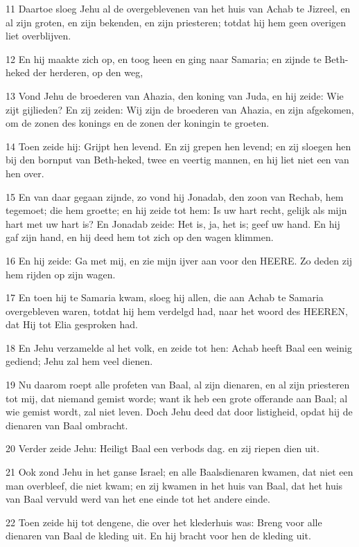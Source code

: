 \par 11 Daartoe sloeg Jehu al de overgeblevenen van het huis van Achab te Jizreel, en al zijn groten, en zijn bekenden, en zijn priesteren; totdat hij hem geen overigen liet overblijven.
\par 12 En hij maakte zich op, en toog heen en ging naar Samaria; en zijnde te Beth-heked der herderen, op den weg,
\par 13 Vond Jehu de broederen van Ahazia, den koning van Juda, en hij zeide: Wie zijt gijlieden? En zij zeiden: Wij zijn de broederen van Ahazia, en zijn afgekomen, om de zonen des konings en de zonen der koningin te groeten.
\par 14 Toen zeide hij: Grijpt hen levend. En zij grepen hen levend; en zij sloegen hen bij den bornput van Beth-heked, twee en veertig mannen, en hij liet niet een van hen over.
\par 15 En van daar gegaan zijnde, zo vond hij Jonadab, den zoon van Rechab, hem tegemoet; die hem groette; en hij zeide tot hem: Is uw hart recht, gelijk als mijn hart met uw hart is? En Jonadab zeide: Het is, ja, het is; geef uw hand. En hij gaf zijn hand, en hij deed hem tot zich op den wagen klimmen.
\par 16 En hij zeide: Ga met mij, en zie mijn ijver aan voor den HEERE. Zo deden zij hem rijden op zijn wagen.
\par 17 En toen hij te Samaria kwam, sloeg hij allen, die aan Achab te Samaria overgebleven waren, totdat hij hem verdelgd had, naar het woord des HEEREN, dat Hij tot Elia gesproken had.
\par 18 En Jehu verzamelde al het volk, en zeide tot hen: Achab heeft Baal een weinig gediend; Jehu zal hem veel dienen.
\par 19 Nu daarom roept alle profeten van Baal, al zijn dienaren, en al zijn priesteren tot mij, dat niemand gemist worde; want ik heb een grote offerande aan Baal; al wie gemist wordt, zal niet leven. Doch Jehu deed dat door listigheid, opdat hij de dienaren van Baal ombracht.
\par 20 Verder zeide Jehu: Heiligt Baal een verbods dag. en zij riepen dien uit.
\par 21 Ook zond Jehu in het ganse Israel; en alle Baalsdienaren kwamen, dat niet een man overbleef, die niet kwam; en zij kwamen in het huis van Baal, dat het huis van Baal vervuld werd van het ene einde tot het andere einde.
\par 22 Toen zeide hij tot dengene, die over het klederhuis was: Breng voor alle dienaren van Baal de kleding uit. En hij bracht voor hen de kleding uit.
